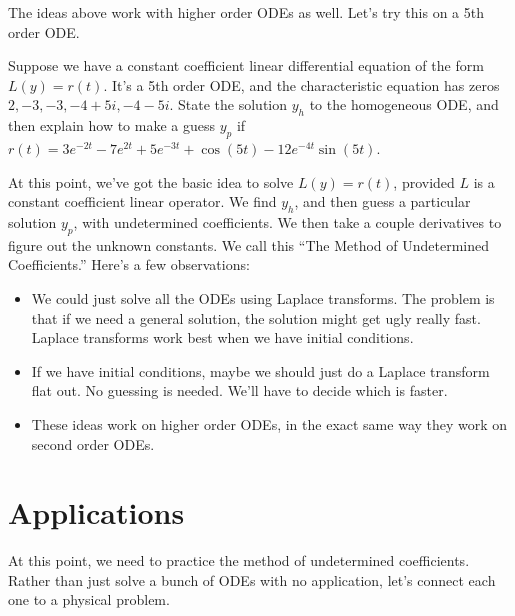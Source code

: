 The ideas above work with higher order ODEs as well.  Let's try this on a 5th order ODE.

\begin{problem}
 Suppose we have a constant coefficient linear differential equation of the form $L(y)=r(t)$. It's a 5th order ODE, and the characteristic equation has zeros $2,-3,-3,-4+5i, -4-5i$.  State the solution $y_h$ to the homogeneous ODE, and then explain how to make a guess $y_p$ if $r(t) = 3e^{-2t}-7e^{2t} +5e^{-3t}+\cos(5t)-12 e^{-4t}\sin(5t)$. 
\end{problem}

At this point, we've got the basic idea to solve $L(y)=r(t)$, provided $L$ is a constant coefficient linear operator. We find $y_h$, and then guess a particular solution $y_p$, with undetermined coefficients.  We then take a couple derivatives to figure out the unknown constants.  We call this ``The Method of Undetermined Coefficients.'' Here's a few observations:
\begin{itemize}
 \item We could just solve all the ODEs using Laplace transforms.  The problem is that if we need a general solution, the solution might get ugly really fast. Laplace transforms work best when we have initial conditions.
 \item If we have initial conditions, maybe we should just do a Laplace transform flat out. No guessing is needed. We'll have to decide which is faster.
 \item These ideas work on higher order ODEs, in the exact same way they work on second order ODEs.  
\end{itemize}

\section{Applications}

At this point, we need to practice the method of undetermined coefficients.  Rather than just solve a bunch of ODEs with no application, let's connect each one to a physical problem.

